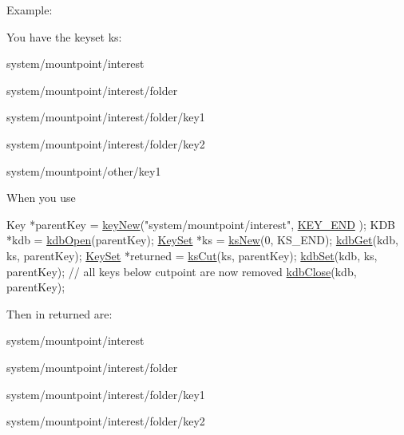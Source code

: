 \begin{DoxyParagraph}{Example\-:}

\end{DoxyParagraph}
You have the keyset {\ttfamily ks\-:} 
\begin{DoxyItemize}
\item {\ttfamily system/mountpoint/interest} 
\item {\ttfamily system/mountpoint/interest/folder} 
\item {\ttfamily system/mountpoint/interest/folder/key1} 
\item {\ttfamily system/mountpoint/interest/folder/key2} 
\item {\ttfamily system/mountpoint/other/key1} 
\end{DoxyItemize}

When you use 
\begin{DoxyCodeInclude}
        Key *parentKey = \hyperlink{group__key_gad23c65b44bf48d773759e1f9a4d43b89}{keyNew}(\textcolor{stringliteral}{"system/mountpoint/interest"}, \hyperlink{group__key_gga91fb3178848bd682000958089abbaf40aa8adb6fcb92dec58fb19410eacfdd403}{KEY\_END}
      );
        KDB *kdb = \hyperlink{group__kdb_ga6808defe5870f328dd17910aacbdc6ca}{kdbOpen}(parentKey);
        \hyperlink{classkdb_1_1KeySet_a4eac9850fa4f06c07a5306befc3e4377}{KeySet} *ks = \hyperlink{group__keyset_ga671e1aaee3ae9dc13b4834a4ddbd2c3c}{ksNew}(0, KS\_END);
        \hyperlink{group__kdb_ga28e385fd9cb7ccfe0b2f1ed2f62453a1}{kdbGet}(kdb, ks, parentKey);
        \hyperlink{classkdb_1_1KeySet_a4eac9850fa4f06c07a5306befc3e4377}{KeySet} *returned = \hyperlink{group__keyset_ga6b00cf82b59af4d883a9bad6cf4a4a4a}{ksCut}(ks, parentKey);
        \hyperlink{group__kdb_ga11436b058408f83d303ca5e996832bcf}{kdbSet}(kdb, ks, parentKey); \textcolor{comment}{// all keys below cutpoint are now
       removed}
        \hyperlink{group__kdb_gadb54dc9fda17ee07deb9444df745c96f}{kdbClose}(kdb, parentKey);
\end{DoxyCodeInclude}
 Then in {\ttfamily returned} are\-:
\begin{DoxyItemize}
\item {\ttfamily system/mountpoint/interest} 
\item {\ttfamily system/mountpoint/interest/folder} 
\item {\ttfamily system/mountpoint/interest/folder/key1} 
\item {\ttfamily system/mountpoint/interest/folder/key2} 
\end{DoxyItemize}

